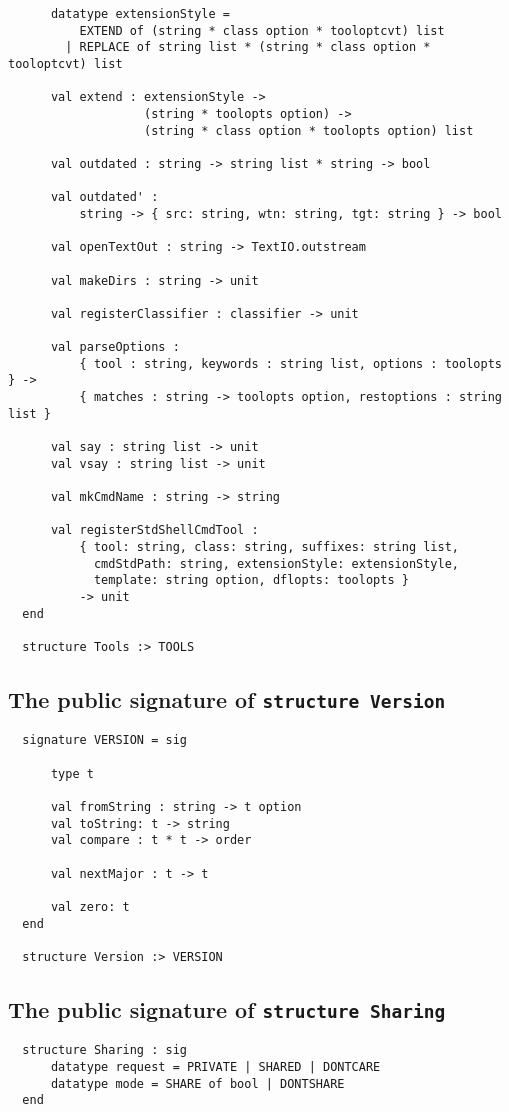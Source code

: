 \begin{lstlisting}
      datatype extensionStyle =
          EXTEND of (string * class option * tooloptcvt) list
        | REPLACE of string list * (string * class option * tooloptcvt) list

      val extend : extensionStyle ->
                   (string * toolopts option) ->
                   (string * class option * toolopts option) list

      val outdated : string -> string list * string -> bool

      val outdated' :
          string -> { src: string, wtn: string, tgt: string } -> bool

      val openTextOut : string -> TextIO.outstream

      val makeDirs : string -> unit

      val registerClassifier : classifier -> unit

      val parseOptions :
          { tool : string, keywords : string list, options : toolopts } ->
          { matches : string -> toolopts option, restoptions : string list }

      val say : string list -> unit
      val vsay : string list -> unit

      val mkCmdName : string -> string

      val registerStdShellCmdTool :
          { tool: string, class: string, suffixes: string list,
            cmdStdPath: string, extensionStyle: extensionStyle,
            template: string option, dflopts: toolopts }
          -> unit
  end

  structure Tools :> TOOLS
\end{lstlisting}%

\subsection{The public signature of {\tt structure Version}}

\begin{lstlisting}
  signature VERSION = sig

      type t

      val fromString : string -> t option
      val toString: t -> string
      val compare : t * t -> order

      val nextMajor : t -> t

      val zero: t
  end

  structure Version :> VERSION
\end{lstlisting}%

\subsection{The public signature of {\tt structure Sharing}}

\begin{lstlisting}
  structure Sharing : sig
      datatype request = PRIVATE | SHARED | DONTCARE
      datatype mode = SHARE of bool | DONTSHARE
  end
\end{lstlisting}%

